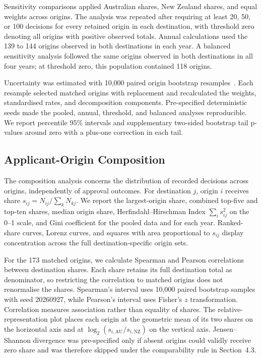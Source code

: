 \documentclass[runningheads]{llncs}
\begin{document}
Sensitivity comparisons applied Australian shares, New Zealand shares, and equal weights across origins. The analysis was repeated after requiring at least 20, 50, or 100 decisions for every retained origin in each destination, with threshold zero denoting all origins with positive observed totals. Annual calculations used the 139 to 144 origins observed in both destinations in each year. A balanced sensitivity analysis followed the same origins observed in both destinations in all four years; at threshold zero, this population contained 118 origins.

Uncertainty was estimated with 10,000 paired origin bootstrap resamples~\cite{Efron1979}. Each resample selected matched origins with replacement and recalculated the weights, standardised rates, and decomposition components. Pre-specified deterministic seeds made the pooled, annual, threshold, and balanced analyses reproducible. We report percentile 95\% intervals and supplementary two-sided bootstrap tail p-values around zero with a plus-one correction in each tail.

\subsection{Applicant-Origin Composition}

The composition analysis concerns the distribution of recorded decisions across origins, independently of approval outcomes. For destination $j$, origin $i$ receives share $s_{ij}=N_{ij}/\sum_k N_{kj}$. We report the largest-origin share, combined top-five and top-ten shares, median origin share, Herfindahl--Hirschman Index $\sum_i s_{ij}^2$ on the 0--1 scale, and Gini coefficient for the pooled data and for each year. Ranked-share curves, Lorenz curves, and squares with area proportional to $s_{ij}$ display concentration across the full destination-specific origin sets.

For the 173 matched origins, we calculate Spearman and Pearson correlations between destination shares. Each share retains its full destination total as denominator, so restricting the correlation to matched origins does not renormalise the shares. Spearman's interval uses 10,000 paired bootstrap samples with seed 20260927, while Pearson's interval uses Fisher's $z$ transformation. Correlation measures association rather than equality of shares. The relative-representation plot places each origin at the geometric mean of its two shares on the horizontal axis and at $\log_2(s_{i,\mathrm{AU}}/s_{i,\mathrm{NZ}})$ on the vertical axis. Jensen--Shannon divergence was pre-specified only if absent origins could validly receive zero share and was therefore skipped under the comparability rule in Section~4.3.
\end{document}
